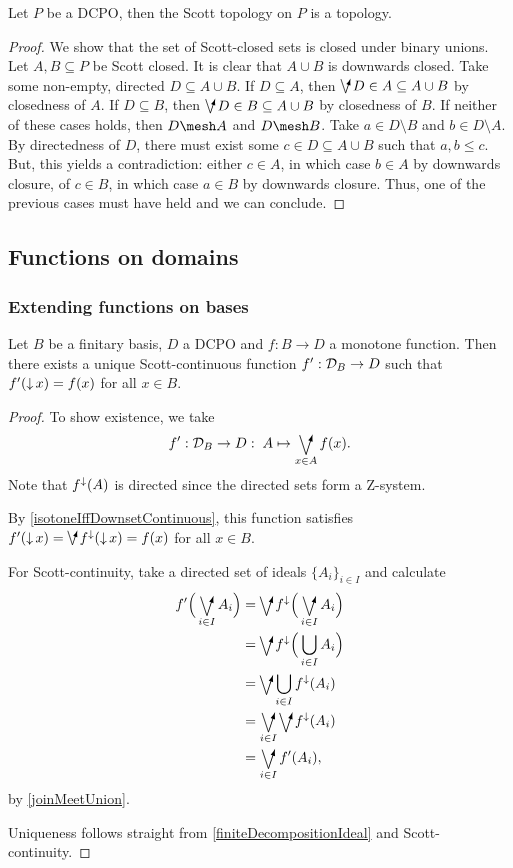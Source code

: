 \begin{proposition}
Let $P$ be a DCPO, then the Scott topology on $P$ is a topology.
\end{proposition}
\begin{proof}
We show that the set of Scott-closed sets is closed under binary unions. Let $A,B \subseteq P$ be Scott closed. It is clear that $A\cup B$ is downwards closed. Take some non-empty, directed $D\subseteq A\cup B$. If $D\subseteq A$, then $\dirvee D \in A \subseteq A\cup B$ by closedness of $A$. If $D\subseteq B$, then $\dirvee D \in B \subseteq A\cup B$ by closedness of $B$. If neither of these cases holds, then $D\mesh A$ and $D\mesh B$. Take $a\in D\setminus B$ and $b\in D\setminus A$. By directedness of $D$, there must exist some $c\in D\subseteq A\cup B$ such that $a,b\leq c$. But, this yields a contradiction: either $c\in A$, in which case $b\in A$ by downwards closure, of $c\in B$, in which case $a\in B$ by downwards closure. Thus, one of the previous cases must have held and we can conclude.
\end{proof}

\subsection{Functions on domains}
\subsubsection{Extending functions on bases}
\begin{proposition}
Let $B$ be a finitary basis, $D$ a DCPO and $f: B \to D$ a monotone function. Then there exists a unique Scott-continuous function $f': \mathcal{D}_B\to D$ such that $f'(\operatorname{\downarrow} x) = f(x)$ for all $x\in B$.
\end{proposition}
\begin{proof}
To show existence, we take
\[ f': \domain_B \to D: \; A \mapsto \dirvee_{x\in A} f(x). \]
Note that $f^\downarrow(A)$ is directed since the directed sets form a $\mathrm{Z}$-system.

By \ref{isotoneIffDownsetContinuous}, this function satisfies $f'(\downset x) = \dirvee f^\imf(\downset x) = f(x)$ for all $x\in B$.

For Scott-continuity, take a directed set of ideals $\{A_i\}_{i\in I}$ and calculate
\begin{align*}
f'\Big(\dirvee_{i\in I} A_i\Big) &= \dirvee f^\imf\Big(\dirvee_{i\in I}A_i \Big) \\
&= \dirvee f^\imf\Big(\bigcup_{i\in I}A_i \Big) \\
&= \dirvee \bigcup_{i\in I} f^\imf(A_i) \\
&= \dirvee_{i\in I} \dirvee f^\imf(A_i) \\
&= \dirvee_{i\in I} f'(A_i),
\end{align*}
by \ref{joinMeetUnion}.

Uniqueness follows straight from \ref{finiteDecompositionIdeal} and Scott-continuity.
\end{proof}

